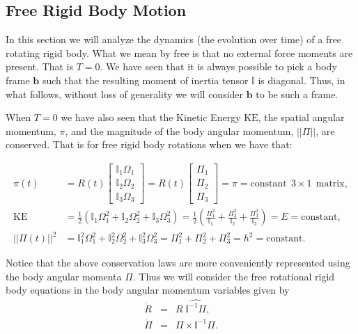 \documentclass[graybox,envcountchap,sectrefs]{svmonoMuga}
\begin{document}
\subsection{Free Rigid Body Motion}\label{Secn:FreeRotating}


In this section we will analyze the dynamics (the evolution over time) of a free rotating rigid body. What we mean by free is that no external force moments are present. That is $T=0$. We have seen that it is always possible to pick a body frame $\mathbf{b}$ such that the resulting moment of inertia tensor $\mathbb{I}$ is diagonal. Thus, in what follows, without loss of generality we will consider $\mathbf{b}$ to be such a frame. 

When $T=0$ we have also seen that 
the Kinetic Energy $\mathrm{KE}$, the spatial angular momentum, $\pi$, and the magnitude of the body angular momentum, $||\Pi||$, are conserved. 
That is for free rigid body rotations when we have that:
\begin{svgraybox}
\begin{align}
\pi(t) &= R(t)\left[
\begin{array}{c}
\mathbb{I}_1\Omega_1\\\mathbb{I}_2\Omega_2\\\mathbb{I}_3\Omega_3
\end{array}
\right]=R(t)\left[
\begin{array}{c}
\Pi_1\\ \Pi_2\\ \Pi_3
\end{array}
\right]=\pi=\mathrm{constant}\:\: 3 \times 1 \:\: \mathrm{matrix},\label{eq:piConst}\\
\mathrm{KE}&=\frac{1}{2}(\mathbb{I}_1\Omega_1^2+\mathbb{I}_2\Omega_2^2+\mathbb{I}_3\Omega_3^2) =\frac{1}{2}\left(\frac{\Pi_1^2}{\mathbb{I}_1}+\frac{\Pi_2^2}{\mathbb{I}_2}+\frac{\Pi_3^2}{\mathbb{I}_3}\right)= E=\mathrm{constant},
\label{eq:KEConst0}\\
||\Pi(t)||^2 &= \mathbb{I}^2_1\Omega_1^2+\mathbb{I}^2_2\Omega_2^2+\mathbb{I}^2_3\Omega_3^2=\Pi_1^2+\Pi_2^2+\Pi_3^2=h^2=\mathrm{constant}.\label{eq:PiConst0}
\end{align}
\end{svgraybox}
Notice that the above conservation laws are more conveniently represented using the body angular momenta $\Pi$. Thus we will consider the free rotational rigid body equations in the body angular momentum variables given by
\begin{eqnarray}
\dot{R} & = & R \;\widehat{\mathbb{I}^{-1}\Pi}, \label{eq:KinematicsPiFree}\\
\dot{\Pi} & = & \Pi \times \mathbb{I}^{-1}\Pi. \label{eq:EulerEqnsPiFree}
\end{eqnarray}
\end{document}
